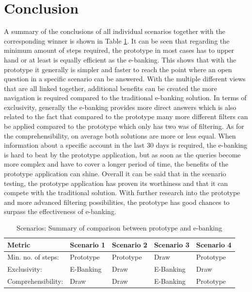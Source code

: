
\section{Conclusion}

A summary of the conclusions of all individual scenarios together with the corresponding winner is shown in Table \ref{tbl:scenariosummary}. It can be seen that regarding the minimum amount of steps required, the prototype in most cases has to upper hand or at least is equally efficient as the e-banking. This shows that with the prototype it generally is simpler and faster to reach the point where an open question in a specific scenario can be answered. With the multiple different views that are all linked together, additional benefits can be created the more navigation is required compared to the traditional e-banking solution. In terms of exclusivity, generally the e-banking provides more direct answers which is also related to the fact that compared to the prototype many more different filters can be applied compared to the prototype which only has two was of filtering. As for the comprehensibility, on average both solutions are more or less equal. When information about a specific account in the last 30 days is required, the e-banking is hard to beat by the prototype application, but as soon as the queries become more complex and have to cover a longer period of time, the benefits of the prototype application can shine. \newline
Overall it can be said that in the scenario testing, the prototype application has proven its worthiness and that it can compete with the traditional solution. With further research into the prototype and more advanced filtering possibilities, the prototype has good chances to surpass the effectiveness of e-banking.
\begin{table}[h]
	\begin{center}
		\begin{tabular}{ | p{3.2cm} | p{2.5cm} | p{2.5cm} | p{2.5cm} | p{2.5cm} | }
			\hline
			\textbf{Metric} & \textbf{Scenario 1} & \textbf{Scenario 2} & \textbf{Scenario 3} & \textbf{Scenario 4} \\
			\hline
			Min. no. of steps: & Prototype & Prototype & Draw & Prototype \\
			\hline
			Exclusivity: & E-Banking & Draw & E-Banking & Draw \\
			\hline
			Comprehensibility: & Draw & Draw & E-Banking & Prototype \\
			\hline
		\end{tabular}
		\caption{Scenarios: Summary of comparison between prototype and e-banking}
		\label{tbl:scenariosummary}
	\end{center}
\end{table} \newline

